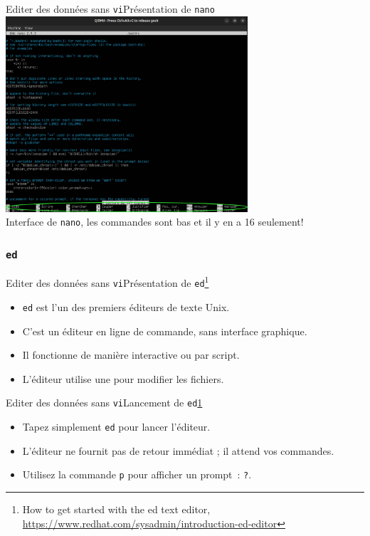 \documentclass{beamer}
\begin{document}
    \begin{frame}{Editer des données sans \lstinline{vi}Présentation de \lstinline{nano}}
        \centering
        \includegraphics[width=9cm]{image/nano-screen.drawio} \\ Interface de \lstinline{nano}, les commandes sont bas et il y en a 16 seulement! \\
    \end{frame}

    \subsubsection{\lstinline{ed}}\label{subsubsec:ed}
    \begin{frame}{Editer des données sans \lstinline{vi}}{Présentation de \lstinline{ed}\footnote{\label{redhated}How to get started with the ed text editor, \url{https://www.redhat.com/sysadmin/introduction-ed-editor}}}
        \begin{itemize}
            \item \lstinline{ed} est l'un des premiers éditeurs de texte Unix.
            \item C'est un éditeur en ligne de commande, sans interface graphique.
            \item Il fonctionne de manière interactive ou par script.
            \item L'éditeur utilise une  pour modifier les fichiers.
        \end{itemize}
    \end{frame}

    \begin{frame}{Editer des données sans \lstinline{vi}}{Lancement de \lstinline{ed}\cref{redhated}}
        \begin{itemize}
            \item Tapez simplement \lstinline{ed} pour lancer l'éditeur.
            \item L'éditeur ne fournit pas de retour immédiat ; il attend vos commandes.
            \item Utilisez la commande \lstinline{p} pour afficher un prompt~: \lstinline{?}.
        \end{itemize}
    \end{frame}
\end{document}
